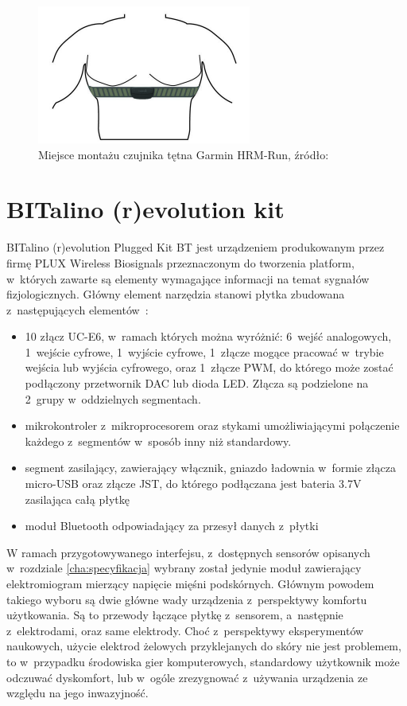 \begin{figure}
	\centering
	\includegraphics[width=0.5\linewidth]{images/garmin_hrm_placement.png}
	\caption{Miejsce montażu czujnika tętna Garmin HRM-Run, źródło:~\cite{garmin_manual}}
	\label{fig:garmin_placement}
\end{figure}

\section{BITalino (r)evolution kit}
BITalino (r)evolution Plugged Kit BT jest urządzeniem produkowanym przez firmę PLUX Wireless Biosignals przeznaczonym do tworzenia platform, w~których zawarte są elementy wymagające informacji na temat sygnałów fizjologicznych. Główny element narzędzia stanowi płytka zbudowana z~następujących elementów~\cite{bitalino_documentation}:
\begin{itemize}
	\item 10 złącz UC-E6, w~ramach których można wyróżnić: 6~wejść analogowych, 1~wejście cyfrowe, 1~wyjście cyfrowe, 1~złącze mogące pracować w~trybie wejścia lub wyjścia cyfrowego, oraz 1~złącze PWM, do którego może zostać podłączony przetwornik DAC lub dioda LED. Złącza są podzielone na 2~grupy w~oddzielnych segmentach.
	\item mikrokontroler z~mikroprocesorem oraz stykami umożliwiającymi połączenie każdego z~segmentów w~sposób inny niż standardowy.
	\item segment zasilający, zawierający włącznik, gniazdo ładownia w~formie złącza micro-USB oraz złącze JST, do którego podłączana jest bateria 3.7V zasilająca całą płytkę
	\item moduł Bluetooth odpowiadający za przesył danych z~płytki
\end{itemize}

W ramach przygotowywanego interfejsu, z~dostępnych sensorów opisanych w~rozdziale \ref{cha:specyfikacja} wybrany został jedynie moduł zawierający elektromiogram mierzący napięcie mięśni podskórnych. Głównym powodem takiego wyboru są dwie główne wady urządzenia z~perspektywy komfortu użytkowania. Są to przewody łączące płytkę z~sensorem, a~następnie z~elektrodami, oraz same elektrody. Choć z~perspektywy eksperymentów naukowych, użycie elektrod żelowych przyklejanych do skóry nie jest problemem, to w~przypadku środowiska gier komputerowych, standardowy użytkownik może odczuwać dyskomfort, lub w~ogóle zrezygnować z~używania urządzenia ze względu na jego inwazyjność. 

